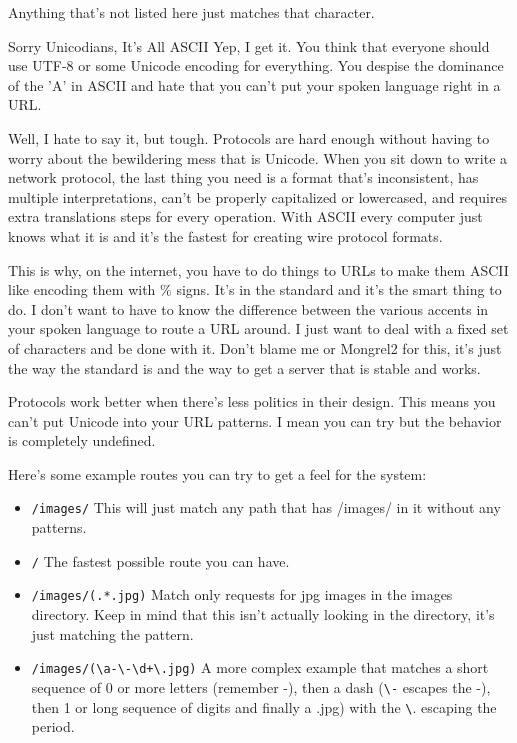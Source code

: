 Anything that's not listed here just matches that character.  

\begin{aside}{Sorry Unicodians, It's All ASCII}
Yep, I get it.  You think that everyone should use UTF-8 or some Unicode encoding for everything.
You despise the dominance of the 'A' in ASCII and hate that you can't put your spoken language
right in a URL.

Well, I hate to say it, but tough.  Protocols are hard enough without having to
worry about the bewildering mess that is Unicode.  When you sit down to write a
network protocol, the last thing you need is a format that's inconsistent, has
multiple interpretations, can't be properly capitalized or lowercased, and
requires extra translations steps for every operation.  With ASCII every
computer just knows what it is and it's the fastest for creating wire protocol
formats.

This is why, on the internet, you have to do things to URLs to make them ASCII
like encoding them with \% signs.  It's in the standard and it's the smart
thing to do.  I don't want to have to know the difference between the various
accents in your spoken language to route a URL around.  I just want to deal
with a fixed set of characters and be done with it.  Don't blame me or Mongrel2
for this, it's just the way the standard is and the way to get a server that is
stable and works.

Protocols work better when there's less politics in their design.  This means
you can't put Unicode into your URL patterns.  I mean you can try but the
behavior is completely undefined.

\end{aside}


Here's some example routes you can try to get a feel for the system:

\begin{itemize}
\item \verb|/images/|  This will just match any path that has /images/ in it without any patterns.
\item \verb|/| The fastest possible route you can have.
\item \verb|/images/(.*.jpg)| Match only requests for jpg images in the images directory.  Keep in mind that this
    isn't actually looking in the directory, it's just matching the  pattern.
\item \verb|/images/(\a-\-\d+\.jpg)| A more complex example that matches a short sequence of 0 or more letters (remember -), then a dash
    (\verb|\-| escapes the -), then 1 or long sequence of digits and finally a .jpg) with the \verb|\|. escaping the period.
\end{itemize}

